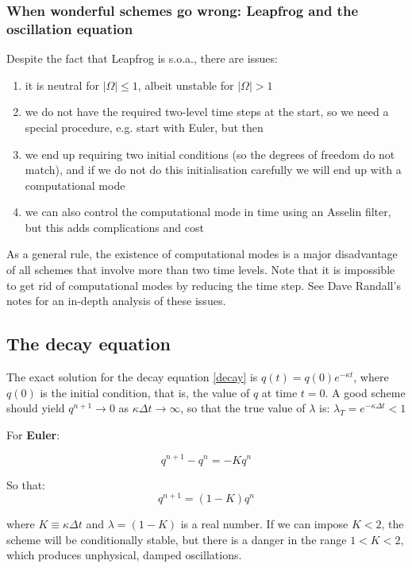 \subsubsection{When wonderful schemes go wrong: Leapfrog and the oscillation equation}
Despite the fact that Leapfrog is s.o.a., there are issues:
\begin{enumerate}
	\item it is neutral for $|\Omega| \le 1$, albeit unstable for  $|\Omega| > 1$
	\item we do not have the required two-level time steps at the start, so we need a special procedure, e.g.  start with Euler, but then
	\item we end up requiring two initial conditions (so the degrees of freedom do not match), and if we do not do this initialisation carefully we will end up with a computational mode
	\item we can also control the computational mode in time using an Asselin filter, but this adds complications and cost
\end{enumerate}
As a general rule, the existence of computational modes is a major disadvantage of all schemes that involve more than two time levels. Note that it is impossible to get rid of computational modes by reducing the time step. See Dave Randall's notes for an in-depth analysis of these issues.

\clearpage
\subsection{The decay equation}

The exact solution for the decay equation \ref{decay} is $q(t) = q(0) e^{- \kappa t}$, where $q(0)$ is the initial condition, that is, the value of $q$ at time $t=0$. A good scheme should yield $q^{n+1} \rightarrow 0$ as $\kappa \Delta t \rightarrow \infty$, so that the true value of $\lambda$ is: $\lambda_T=e^{- \kappa \Delta t} < 1 $

For {\bf Euler}: 

\begin{equation}
	q^{n+1} -q^n = -K q^n
	\label{decay-solution-euler2}
\end{equation}

So that: 
\begin{equation}
	q^{n+1} = (1-K) q^n
	\label{decay-solution-euler3}
\end{equation}

where $K \equiv \kappa \Delta t$ and $\lambda = (1-K)$ is a real number. If we can impose $K < 2$, the scheme will be conditionally stable, but there is a danger in the range $1< K < 2$, which produces unphysical, damped oscillations.

